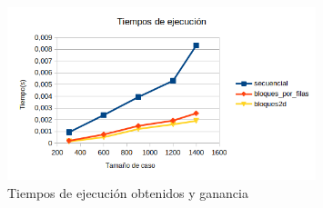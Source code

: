 \begin{figure}[H]
\centering
\includegraphics[width=0.8\textwidth]{imagenes/graphic.png}
\caption{Tiempos de ejecución obtenidos y ganancia}
\end{figure}

